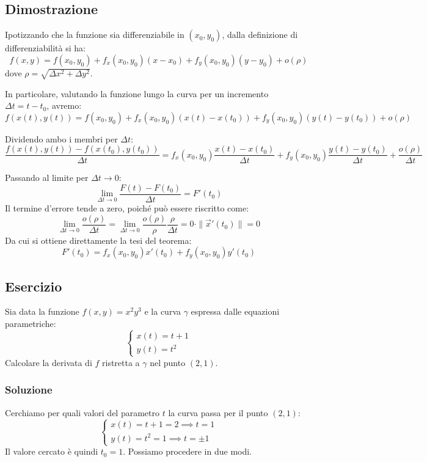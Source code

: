 \subsection{Dimostrazione}
Ipotizzando che la funzione sia differenziabile in $(x_0, y_0)$, dalla definizione di differenziabilità si ha:
\[ f(x,y) = f(x_0, y_0) + f_x(x_0, y_0)(x - x_0) + f_y(x_0, y_0)(y - y_0) + o(\rho) \]
dove $\rho = \sqrt{\Delta x^2 + \Delta y^2}$.

In particolare, valutando la funzione lungo la curva per un incremento $\Delta t = t - t_0$, avremo:
\[ f(x(t), y(t)) = f(x_0, y_0) + f_x(x_0, y_0)(x(t) - x(t_0)) + f_y(x_0, y_0)(y(t) - y(t_0)) + o(\rho) \]

Dividendo ambo i membri per $\Delta t$:
\[ \frac{f(x(t), y(t)) - f(x(t_0), y(t_0))}{\Delta t} = f_x(x_0, y_0)\frac{x(t) - x(t_0)}{\Delta t} + f_y(x_0, y_0)\frac{y(t) - y(t_0)}{\Delta t} + \frac{o(\rho)}{\Delta t} \]

Passando al limite per $\Delta t \to 0$:
\[ \lim_{\Delta t \to 0} \frac{F(t) - F(t_0)}{\Delta t} = F'(t_0) \]
Il termine d'errore tende a zero, poiché può essere riscritto come:
\[ \lim_{\Delta t \to 0} \frac{o(\rho)}{\Delta t} = \lim_{\Delta t \to 0} \frac{o(\rho)}{\rho} \frac{\rho}{\Delta t} = 0 \cdot \|\vec{x}'(t_0)\| = 0 \]
Da cui si ottiene direttamente la tesi del teorema:
\[ F'(t_0) = f_x(x_0, y_0) x'(t_0) + f_y(x_0, y_0) y'(t_0) \]

\subsection{Esercizio}
Sia data la funzione $f(x,y) = x^2 y^3$ e la curva $\gamma$ espressa dalle equazioni parametriche:
\[
\begin{cases}
x(t) = t + 1 \\
y(t) = t^2
\end{cases}
\]
Calcolare la derivata di $f$ ristretta a $\gamma$ nel punto $(2, 1)$.

\subsubsection{Soluzione}
Cerchiamo per quali valori del parametro $t$ la curva passa per il punto $(2,1)$:
\[
\begin{cases}
x(t) = t + 1 = 2 \implies t = 1 \\
y(t) = t^2 = 1 \implies t = \pm 1
\end{cases}
\]
Il valore cercato è quindi $t_0 = 1$. Possiamo procedere in due modi.

